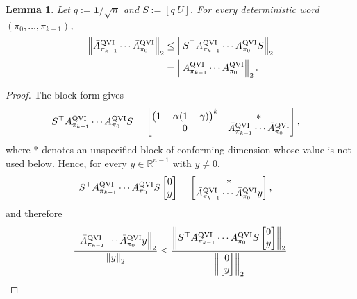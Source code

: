 \documentclass[letterpaper]{article}
\numberwithin{equation}{section}
\newtheorem{lemma}{Lemma}[section]
\newcommand{\R}{\mathbb{R}}
\begin{document}
\begin{lemma}
\label{lem:projected-product-norm-bound}
Let $q:=\mathbf{1}/\sqrt n$ and $S:=[q\ U]$. For every deterministic word
$(\pi_0,\ldots,\pi_{k-1})$,
\begin{align*}
  \left\lVert
    \bar A_{\pi_{k-1}}^{\rm QVI}\cdots \bar A_{\pi_0}^{\rm QVI}
  \right\rVert_2
  &\le
  \left\lVert
    S^\top A_{\pi_{k-1}}^{\rm QVI}\cdots A_{\pi_0}^{\rm QVI}S
  \right\rVert_2\\
  &=
  \left\lVert
    A_{\pi_{k-1}}^{\rm QVI}\cdots A_{\pi_0}^{\rm QVI}
  \right\rVert_2.
\end{align*}
\end{lemma}
\begin{proof}
The block form gives
\begin{equation*}
\begin{aligned}
&S^\top A_{\pi_{k-1}}^{\rm QVI}\cdots A_{\pi_0}^{\rm QVI}S =
  \begin{bmatrix}
    \bigl(1-\alpha(1-\gamma)\bigr)^k&*\\
    0&\bar A_{\pi_{k-1}}^{\rm QVI}\cdots \bar A_{\pi_0}^{\rm QVI}
  \end{bmatrix},
\end{aligned}
\end{equation*}
where $*$ denotes an unspecified block of conforming dimension whose value is not
used below. Hence, for every $y\in\R^{n-1}$ with $y\ne0$,
\begin{align*}
  &S^\top A_{\pi_{k-1}}^{\rm QVI}\cdots A_{\pi_0}^{\rm QVI}S
  \begin{bmatrix}0\\y\end{bmatrix}
  =
  \begin{bmatrix}
    *\\
    \bar A_{\pi_{k-1}}^{\rm QVI}\cdots \bar A_{\pi_0}^{\rm QVI}y
  \end{bmatrix},
\end{align*}
and therefore
\begin{align*}
  \frac{
  \left\lVert
    \bar A_{\pi_{k-1}}^{\rm QVI}\cdots \bar A_{\pi_0}^{\rm QVI}y
  \right\rVert_2}{\left\lVert y\right\rVert_2}
  &\le
  \frac{
  \left\lVert
    S^\top A_{\pi_{k-1}}^{\rm QVI}\cdots A_{\pi_0}^{\rm QVI}S
    \begin{bmatrix}0\\y\end{bmatrix}
  \right\rVert_2}{\left\lVert \begin{bmatrix}0\\y\end{bmatrix}\right\rVert_2}\\

\end{align*}
\end{proof}
\end{document}
